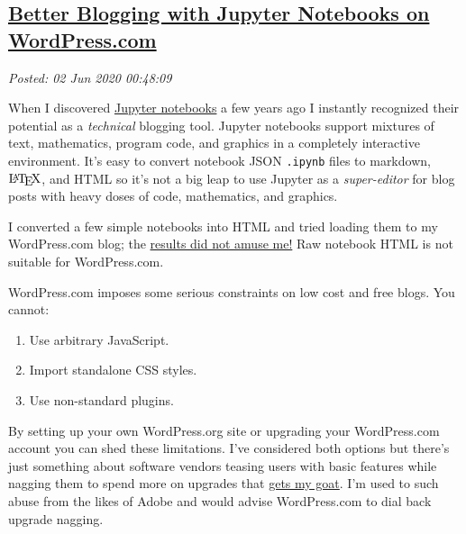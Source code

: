 %  
    
\subsection*{\href{http://analyzethedatanotthedrivel.org/2020/06/01/better-blogging-with-jupyter-notebooks-on-wordpress-com/}{Better Blogging with Jupyter Notebooks on WordPress.com}}


\noindent\emph{Posted: 02 Jun 2020 00:48:09}
\vspace{6pt}
    
    When I discovered \href{https://jupyter.org/}{Jupyter notebooks} a few
years ago I instantly recognized their potential as a \emph{technical}
blogging tool. Jupyter notebooks support mixtures of text, mathematics,
program code, and graphics in a completely interactive environment. It's
easy to convert notebook JSON \texttt{.ipynb} files to markdown,
\(\LaTeX\), and HTML so it's not a big leap to use Jupyter as a
\emph{super-editor} for blog posts with heavy doses of code,
mathematics, and graphics.

I converted a few simple notebooks into HTML and tried loading them to
my WordPress.com blog; the
\href{https://analyzethedatanotthedrivel.org/2017/12/24/downloading-smugmug-captions-with-python-and-jupyter/}{results
did not amuse me!} Raw notebook HTML is not suitable for WordPress.com.

WordPress.com imposes some serious constraints on low cost and free
blogs. You cannot:

\begin{enumerate}
\def\labelenumi{\arabic{enumi}.}
\tightlist
\item
  Use arbitrary JavaScript.
\item
  Import standalone CSS styles.
\item
  Use non-standard plugins.
\end{enumerate}

By setting up your own WordPress.org site or upgrading your
WordPress.com account you can shed these limitations. I've considered
both options but there's just something about software vendors teasing
users with basic features while nagging them to spend more on upgrades
that
\href{https://www.wisegeek.com/what-does-gets-my-goat-mean.htm}{gets my
goat}. I'm used to such abuse from the likes of Adobe and would advise
WordPress.com to dial back upgrade nagging.

